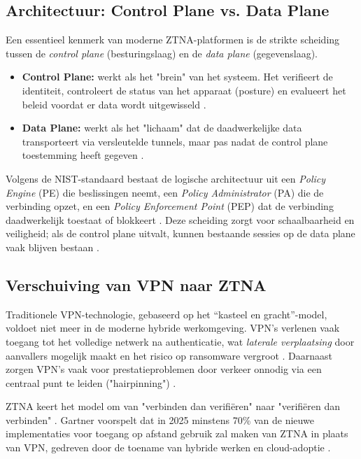 \subsection{Architectuur: Control Plane vs. Data Plane}
Een essentieel kenmerk van moderne ZTNA-platformen is de strikte scheiding tussen de \textit{control plane} (besturingslaag) en de \textit{data plane} (gegevenslaag).
\begin{itemize}
	\item \textbf{Control Plane:} werkt als het "brein" van het systeem. Het verifieert de identiteit, controleert de status van het apparaat (posture) en evalueert het beleid voordat er data wordt uitgewisseld \parencite{terrazone2025}.
	\item \textbf{Data Plane:} werkt als het "lichaam" dat de daadwerkelijke data transporteert via versleutelde tunnels, maar pas nadat de control plane toestemming heeft gegeven \parencite{terrazone2025}.
\end{itemize}
Volgens de NIST-standaard bestaat de logische architectuur uit een \textit{Policy Engine} (PE) die beslissingen neemt, een \textit{Policy Administrator} (PA) die de verbinding opzet, en een \textit{Policy Enforcement Point} (PEP) dat de verbinding daadwerkelijk toestaat of blokkeert \parencite{rose2020zero}. Deze scheiding zorgt voor schaalbaarheid en veiligheid; als de control plane uitvalt, kunnen bestaande sessies op de data plane vaak blijven bestaan \parencite{terrazone2025}.

\subsection{Verschuiving van VPN naar ZTNA}
Traditionele VPN-technologie, gebaseerd op het ``kasteel en gracht''-model, voldoet niet meer in de moderne hybride werkomgeving. VPN's verlenen vaak toegang tot het volledige netwerk na authenticatie, wat \textit{laterale verplaatsing} door aanvallers mogelijk maakt en het risico op ransomware vergroot \autocite{barracuda2024}. Daarnaast zorgen VPN's vaak voor prestatieproblemen door verkeer onnodig via een centraal punt te leiden ("hairpinning") \autocite{seqrite2025}.

ZTNA keert het model om van "verbinden dan verifiëren" naar "verifiëren dan verbinden" \autocite{nflo2025}. Gartner voorspelt dat in 2025 minstens 70\% van de nieuwe implementaties voor toegang op afstand gebruik zal maken van ZTNA in plaats van VPN, gedreven door de toename van hybride werken en cloud-adoptie \autocite{gartner2022}.

